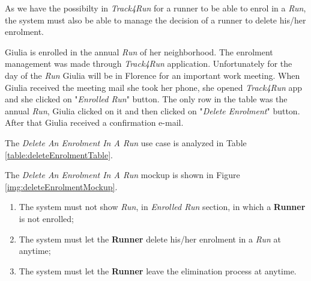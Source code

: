 As we have the possibilty in \textit{Track4Run} for a runner to be able to enrol in a \textit{Run}, the system must also be able to manage the decision of a runner to delete his/her enrolment.

Giulia is enrolled in the annual \textit{Run} of her neighborhood. The enrolment management was made through \textit{Track4Run} application. Unfortunately for the day of the \textit{Run} Giulia will be in Florence for an important work meeting.
When Giulia received the meeting mail she took her phone, she opened \textit{Track4Run} app and she clicked on "\textit{Enrolled Run}" button.
The only row in the table was the annual \textit{Run}, Giulia clicked on it and then clicked on "\textit{Delete Enrolment}" button.
After that Giulia received a confirmation e-mail.

The \textit{Delete An Enrolment In A Run} use case is analyzed in Table \ref{table:deleteEnrolmentTable}.

The \textit{Delete An Enrolment In A Run} mockup is shown in Figure \ref{img:deleteEnrolmentMockup}.

\begin{enumerate}
  \item The system must not show \textit{Run}, in \textit{Enrolled Run} section, in which a \textbf{Runner} is not enrolled;
  \item The system must let the \textbf{Runner} delete his/her enrolment in a \textit{Run} at anytime;
  \item The system must let the \textbf{Runner} leave the elimination process at anytime.
\end{enumerate}

